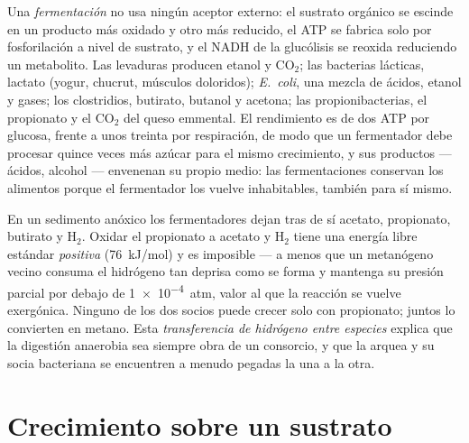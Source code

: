 \begin{definition}\label{def:b2:microbial-metabolism:fermentation}
Una \emph{fermentación} no usa ningún aceptor externo: el sustrato
orgánico se escinde en un producto más oxidado y otro más reducido, el
ATP se fabrica solo por fosforilación a nivel de sustrato, y el NADH de
la glucólisis se reoxida reduciendo un metabolito. Las levaduras producen
etanol y $\mathrm{CO_2}$; las bacterias lácticas, lactato (yogur, chucrut,
músculos doloridos); \emph{E.~coli}, una mezcla de ácidos, etanol y gases;
los clostridios, butirato, butanol y acetona; las propionibacterias, el
propionato y el $\mathrm{CO_2}$ del queso emmental. El rendimiento es de
dos ATP por glucosa, frente a unos treinta por respiración, de modo que un
fermentador debe procesar quince veces más azúcar para el mismo
crecimiento, y sus productos --- ácidos, alcohol --- envenenan su propio
medio: las fermentaciones conservan los alimentos porque el fermentador
los vuelve inhabitables, también para sí mismo.
\end{definition}

\begin{example}\label{ex:b2:microbial-metabolism:syntrophy}
En un sedimento anóxico los fermentadores dejan tras de sí acetato,
propionato, butirato y $\mathrm{H_2}$. Oxidar el propionato a acetato y
$\mathrm{H_2}$ tiene una energía libre estándar \emph{positiva}
(\qty{+76}{kJ/mol}) y es imposible --- a menos que un metanógeno vecino
consuma el hidrógeno tan deprisa como se forma y mantenga su presión
parcial por debajo de \qty{1e-4}{atm}, valor al que la reacción se vuelve
exergónica. Ninguno de los dos socios puede crecer solo con propionato;
juntos lo convierten en metano. Esta \emph{transferencia de hidrógeno
entre especies} explica que la digestión anaerobia sea siempre obra de
un consorcio, y que la arquea y su socia bacteriana se encuentren a
menudo pegadas la una a la otra.
\end{example}

\section{Crecimiento sobre un sustrato}


